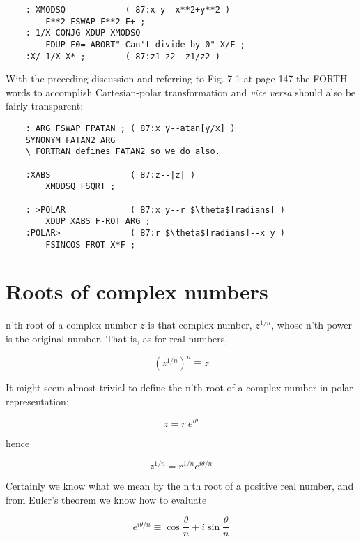 \begin{lstlisting}
    : XMODSQ            ( 87:x y--x**2+y**2 )
        F**2 FSWAP F**2 F+ ;
    : 1/X CONJG XDUP XMODSQ
        FDUP F0= ABORT" Can't divide by 0" X/F ;
    :X/ 1/X X* ;        ( 87:z1 z2--z1/z2 )
\end{lstlisting}

With the preceding discussion and referring to Fig. 7-1 at page 147 the FORTH words to accomplish Cartesian-polar transformation and \textit{vice versa} should also be fairly transparent:

\begin{lstlisting}
    : ARG FSWAP FPATAN ; ( 87:x y--atan[y/x] )
    SYNONYM FATAN2 ARG
    \ FORTRAN defines FATAN2 so we do also.

    :XABS                ( 87:z--|z| )
        XMODSQ FSQRT ;

    : >POLAR             ( 87:x y--r $\theta$[radians] )
        XDUP XABS F-ROT ARG ;
    :POLAR>              ( 87:r $\theta$[radians]--x y )
        FSINCOS FROT X*F ;
\end{lstlisting}

\section{Roots of complex numbers}
 n'th root of a complex number $z$ is that complex number, $z^{1/n}$, whose n'th power is the original number. That is, as for real numbers,

\begin{equation}
  \left(z^{1/n}\right)^n \equiv z
\end{equation}

It might seem almost trivial to define the n’th root of a complex number in polar representation:

\begin{equation}
  z = r\ e^{i\theta}
\end{equation}

hence

\begin{equation}
  z^{1/n} = r^{1/n} e^{i\theta/n}
  \label{eq:07_20}
\end{equation}

Certainly we know what we mean by the n‘th root of a positive real number, and from Euler’s theorem we know how to evaluate

\begin{equation}
  e^{i\theta/n} \equiv \cos\frac{\theta}{n} + i \sin\frac{\theta}{n}
\end{equation}

